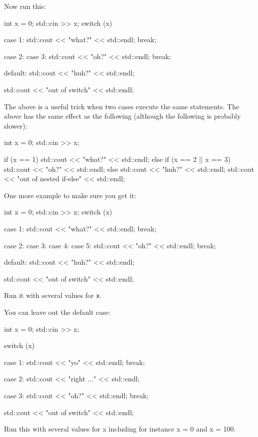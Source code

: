 Now run this:
\begin{console}
int x = 0;
std::cin >> x;
switch (x)
{
     case 1:
        std::cout << "what?" << std::endl;
        break;
        
     case 2:
     case 3:
        std::cout << "oh?" << std::endl;
        break;
        
     default:
        std::cout << "huh?" << std::endl;
}
std::cout << "out of switch" << std::endl;
\end{console}
The above is a useful trick when two cases execute the same statements.
The above has the same effect as the following (although the following
is probably slower):
\begin{console}
int x = 0;
std::cin >> x;

if (x == 1)
{
     std::cout << "what?" << std::endl;
}
else if (x == 2 || x == 3)
{
     std::cout << "oh?" << std::endl;
}
else
{
     std::cout << "huh?" << std::endl;
}
std::cout << "out of nested if-else" << std::endl;
\end{console}
One more example to make sure you get it:
\begin{console}
int x = 0;
std::cin >> x;
switch (x)
{
     case 1:
          std::cout << "what?" << std::endl;
          break;
          
     case 2:
     case 3:
     case 4:
     case 5:
          std::cout << "oh?" << std::endl;
          break;
          
     default:
          std::cout << "huh?" << std::endl;
}
std::cout << "out of switch" << std::endl;
\end{console}
Run it with several values for \texttt{x}.

\newpage{}

You can leave out the default case:
\begin{console}
int x = 0;
std::cin >> x;

switch (x)
{
     case 1:
          std::cout << "yo" << std::endl;
          break;
          
     case 2:
          std::cout << "right ..." << std::endl;

     case 3:
          std::cout << "oh?" << std::endl;
          break;
}
std::cout << "out of switch" << std::endl;
\end{console}

Run this with several values for x including for instance x = 0 and x =
100.

\newpage{}


